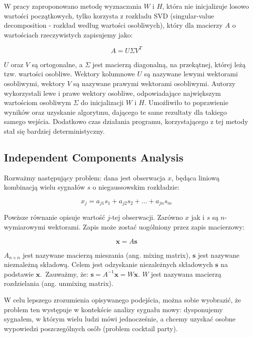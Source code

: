 \documentclass[oneside, eng]{mgr}
\newcommand{\bb}{\textbf}
\begin{document}
W pracy \cite{NMF_SVD} zaproponowano metodę wyznaczania $W$ i $H$, która nie inicjalizuje losowo wartości początkowych, tylko korzysta z rozkładu SVD (singular-value decomposition - rozkład według wartości osobliwych), który dla macierzy $A$ o wartościach rzeczywistych zapisujemy jako:

\begin{equation}
	A = U \Sigma V^T
\end{equation}

$U$ oraz $V$ są ortogonalne, a $\Sigma$ jest macierzą diagonalną, na przekątnej, której leżą tzw. wartości osobliwe. Wektory kolumnowe $U$ są nazywane lewymi wektorami osobliwymi, wektory $V$ są nazywane prawymi wektorami osobliwymi. Autorzy \cite{NMF_SVD} wykorzystali lewe i prawe wektory osobliwe, odpowiadające największym wartościom osobliwym $\Sigma$ do inicjalizacji $W$ i $H$. Umożliwiło to poprawienie wyników oraz uzyskanie algorytmu, dającego te same rezultaty dla takiego samego wejścia. Dodatkowo czas działania programu, korzystającego z tej metody stał się bardziej deterministyczny.

\subsection{Independent Components Analysis}

Rozważmy następujący problem: dana jest obserwacja $x$, będąca liniową kombinacją wielu sygnałów $s$ o niegaussowskim rozkładzie:

\begin{equation}
	x_j = a_{j1} s_1 + a_{j2} s_2 + ... + a_{jn} s_m
\end{equation}

Powższe równanie opisuje wartość $j$-tej obserwacji. Zarówno $x$ jak i $s$ są $n$-wymiarowymi wektorami. Zapis może zostać uogólniony przez zapis macierzowy:

\begin{equation}
	\bb{x} = A \bb{s}
	\label{ICA model}
\end{equation}

$A_{n \times n}$ jest nazywane macierzą mieszania (ang. mixing matrix), $\bb{s}$ jest nazywane nieznależną składową. Celem jest odzyskanie niezależnych składowych $\bb{s}$ na podstawie $\bb{x}$.~Zauważmy, że: $\bb{s} = A^{-1}\bb{x} = W \bb{x}$. $W$ jest nazywana macierzą rozdzielania (ang. unmixing matrix). 

W celu lepszego zrozumienia opisywanego podejścia, można sobie wyobrazić, że problem ten występuje w kontekście analizy sygnału mowy: dysponujemy sygnałem, w którym wielu ludzi mówi jednocześnie, a chcemy uzyskać osobne wypowiedzi poszczególnych osób (problem cocktail party). 
\end{document}
